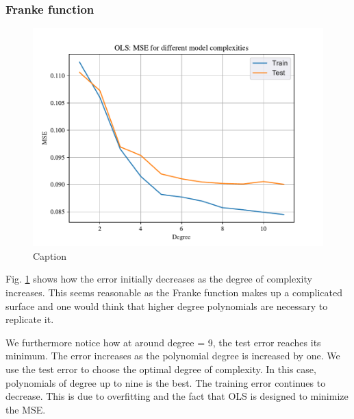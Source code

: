 
\subsubsection{Franke function}

\begin{figure}
    \centering
    \includegraphics[width=1\linewidth]{project_1_alt/figures/data/OLS_MSE_Franke_Noise.pdf}
    \caption{Caption}
    \label{fig:mseols}
\end{figure}

Fig. \ref{fig:mseols} shows how the error initially decreases as the degree of complexity increases. This seems reasonable as the Franke function makes up a complicated surface and one would think that higher degree polynomials are necessary to replicate it. 

We furthermore notice how at around degree = 9, the test error reaches its minimum. The error increases as the polynomial degree is increased by one. We use the test error to choose the optimal degree of complexity. In this case, polynomials of degree up to nine is the best. The training error continues to decrease. This is due to overfitting and the fact that OLS is designed to minimize the MSE. 



